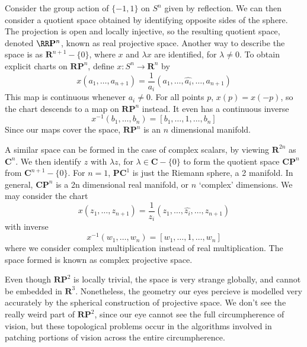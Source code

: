 \begin{example}
    Consider the group action of $\{ -1, 1 \}$ on $S^n$ given by reflection. We can then consider a quotient space obtained by identifying opposite sides of the sphere. The projection is open and locally injective, so the resulting quotient space, denoted $\RR \mathbf{P}^n$, known as real projective space. Another way to describe the space is as $\mathbf{R}^{n+1} - \{ 0 \}$, where $x$ and $\lambda x$ are identified, for $\lambda \neq 0$. To obtain explicit charts on $\mathbf{R} \mathbf{P}^n$, define $x: S^n \to \mathbf{R}^n$ by
    \[ x(a_1, \dots, a_{n+1}) = \frac{1}{a_i} (a_1, \dots, \widehat{a_i}, \dots, a_{n+1}) \]
    This map is continuous whenever $a_i \neq 0$. For all points $p$, $x(p) = x(-p)$, so the chart descends to a map on $\mathbf{R} \mathbf{P}^n$ instead. It even has a continuous inverse
    \[ x^{-1}(b_1, \dots, b_n) = \left[ b_1, \dots, 1, \dots, b_n \right] \]
    Since our maps cover the space, $\mathbf{R} \mathbf{P}^n$ is an $n$ dimensional manifold.
\end{example}

\begin{example}
    A similar space can be formed in the case of complex scalars, by viewing $\mathbf{R}^{2n}$ as $\mathbf{C}^n$. We then identify $z$ with $\lambda z$, for $\lambda \in \mathbf{C} - \{ 0 \}$ to form the quotient space $\mathbf{CP}^n$ from $\mathbf{C}^{n+1} - \{ 0 \}$. For $n = 1$, $\mathbf{P} \mathbf{C}^1$ is just the Riemann sphere, a 2 manifold. In general, $\mathbf{CP}^n$ is a 2n dimensional real manifold, or $n$ `complex' dimensions. We may consider the chart
    \[ x(z_1, \dots, z_{n+1}) = \frac{1}{z_i} (z_1, \dots, \widehat{z_i}, \dots, z_{n+1}) \]
    with inverse
    \[ x^{-1}(w_1, \dots, w_n) = [w_1, \dots, 1, \dots, w_n] \]
    where we consider complex multiplication instead of real multiplication. The space formed is known as complex projective space.
\end{example}

Even though $\mathbf{RP}^2$ is locally trivial, the space is very strange globally, and cannot be embedded in $\mathbf{R}^3$. Nonetheless, the geometry our eyes percieve is modelled very accurately by the spherical construction of projective space. We don't see the really weird part of $\mathbf{R} \mathbf{P}^2$, since our eye cannot see the full circumpherence of vision, but these topological problems occur in the algorithms involved in patching portions of vision across the entire circumpherence.

